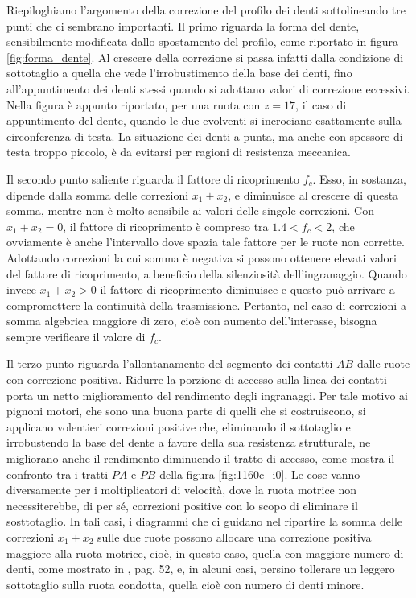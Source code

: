 \noindent Riepiloghiamo
l'argomento della correzione del profilo dei denti sottolineando tre punti
che ci sembrano importanti. 
Il primo riguarda la forma del dente, sensibilmente modificata
dallo spostamento del profilo,
come riportato in figura \ref{fig:forma_dente}.
Al crescere della correzione si passa infatti dalla condizione di
 sottotaglio a quella
che vede l'irrobustimento della 
base dei denti, fino all'appuntimento dei denti stessi quando si 
adottano valori di correzione eccessivi.
Nella figura \`e appunto riportato, per una ruota con $z=17$, il
caso di appuntimento del dente, quando le due evolventi si incrociano esattamente
sulla circonferenza di testa. La situazione dei denti a punta, ma anche con
spessore di testa troppo piccolo, \`e da evitarsi per ragioni di resistenza
meccanica.

\noindent Il secondo punto saliente riguarda
 il fattore di ricoprimento $f_c$. Esso, in sostanza, dipende
dalla somma delle correzioni $x_1 + x_2$, e 
diminuisce al crescere di questa somma, mentre non \`e molto sensibile ai valori
delle singole correzioni.
Con $x_1+x_2=0$, il fattore di ricoprimento \`e compreso tra $1.4<f_c<2$, che
ovviamente \`e anche l'intervallo dove spazia tale fattore per le ruote
non corrette.
Adottando correzioni la cui somma \`e negativa si possono
ottenere elevati valori del fattore di ricoprimento, a beneficio della
silenziosit\`a dell'ingranaggio.
Quando invece $x_1 + x_2 > 0$ il fattore di ricoprimento diminuisce e questo
pu\`o arrivare a compromettere
 la continuit\`a della trasmissione. Pertanto, nel caso di correzioni a
somma algebrica maggiore di zero, cio\`e con aumento dell'interasse,
bisogna sempre verificare il valore di $f_c$.

\noindent Il terzo punto riguarda l'allontanamento del segmento dei
 contatti $AB$ dalle ruote con correzione positiva. Ridurre la porzione
di accesso sulla linea dei contatti porta un netto
miglioramento del rendimento degli ingranaggi. Per tale motivo ai pignoni
motori, che sono una buona parte di quelli che si costruiscono, si applicano
volentieri correzioni positive che, eliminando il sottotaglio e irrobustendo
la base del dente a favore della sua resistenza strutturale, ne migliorano anche
il rendimento diminuendo il tratto di accesso, come mostra il confronto
tra i tratti $PA$ e $PB$ della figura \ref{fig:1160c_i0}.
Le cose vanno diversamente per i moltiplicatori di velocit\`a, dove la ruota
motrice non necessiterebbe, di per s\'e, correzioni positive con lo scopo
di eliminare il sosttotaglio. In tali casi, i diagrammi che ci guidano
nel ripartire la somma delle correzioni $x_1+x_2$ sulle due ruote possono
allocare una correzione positiva maggiore alla ruota motrice, cio\`e,
in questo caso, quella con maggiore numero di denti, come mostrato
in \cite{righettini}, pag. 52, e, in alcuni casi, persino 
tollerare un leggero
sottotaglio sulla ruota condotta, quella cio\`e con numero di denti minore.

